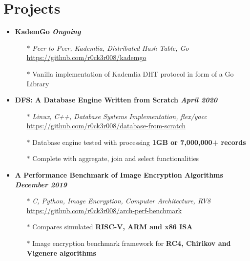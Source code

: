 \documentclass[10pt,a4paper]{article}
\begin{document}
\section{{\faCoffee} Projects}
	\begin{itemize}[noitemsep,nolistsep]

		\item\textbf{KademGo \hfill \textit{Ongoing}}
			\begin{itemize}[leftmargin=*]
				\setlength\itemsep{-0.25em}
				\item[$\ast$]\textit{Peer to Peer, Kademlia, Distributed Hash Table, Go} \hfill \href{https://github.com/r0ck3r008/kademgo}{{\scriptsize https://github.com/r0ck3r008/kademgo}}
				\item[$\ast$]Vanilla implementation of Kademlia DHT protocol in form of a Go Library
			\end{itemize}

		\item\textbf{DFS: A Database Engine Written from Scratch \hfill \textit{April 2020}}
			\begin{itemize}[leftmargin=*]
				\setlength\itemsep{-0.25em}
				\item[$\ast$]\textit{Linux, C++, Database Systems Implementation, flex/yacc} \hfill \href{https://github.com/r0ck3r008/database-from-scratch}{{\scriptsize https://github.com/r0ck3r008/database-from-scratch}}
				\item[$\ast$]Database engine tested with processing \textbf{1GB or 7,000,000+ records}
				\item[$\ast$]Complete with aggregate, join and select functionalities
			\end{itemize}

		\item\textbf{A Performance Benchmark of Image Encryption Algorithms \hfill \textit{December 2019}}
			\begin{itemize}[leftmargin=*]
				\setlength\itemsep{-0.25em}
				\item[$\ast$]\textit{C, Python, Image Encryption, Computer Architecture, RV8} \hfill \href{https://github.com/r0ck3r008/arch-perf-benchmark}{{\scriptsize https://github.com/r0ck3r008/arch-perf-benchmark}}
				\item[$\ast$]Compares simulated \textbf{RISC-V, ARM and x86 ISA}
				\item[$\ast$]Image encryption benchmark framework for \textbf{RC4, Chirikov and Vigenere algorithms}
			\end{itemize}


\end{itemize}
\end{document}
